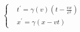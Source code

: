 \documentclass[preview]{standalone}
\begin{document}
\begin{align*}
\begin{cases} & t^\prime = \gamma(v) \left(t - \frac{vx}{c^2}\right) \\ & x^\prime = \gamma (x-vt) \end{cases}
\end{align*}
\end{document}
